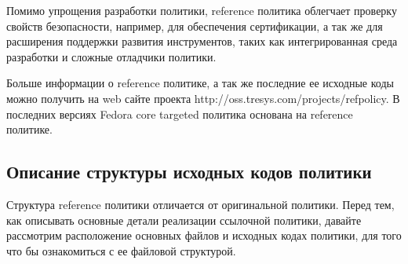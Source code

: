 \documentclass{./../class/UIR}
\begin{document}
	Помимо упрощения разработки политики, reference политика облегчает проверку
	свойств безопасности, например, для обеспечения сертификации, а так же для
	расширения поддержки развития инструментов, таких как интегрированная среда
	разработки и сложные отладчики политики.
	
	
	Больше информации о reference политике, а так же последние ее исходные коды
	можно получить на web сайте проекта http://oss.tresys.com/projects/refpolicy.
	В последних версиях Fedora core targeted политика основана на reference политике.
	
\subsection{Описание структуры исходных кодов политики}
	
	Структура reference политики отличается от оригинальной политики. Перед тем,
	как описывать основные детали реализации ссылочной политики, давайте рассмотрим
	расположение основных файлов и исходных кодах политики, для того что бы
	ознакомиться с ее файловой структурой.
	
\end{document}
